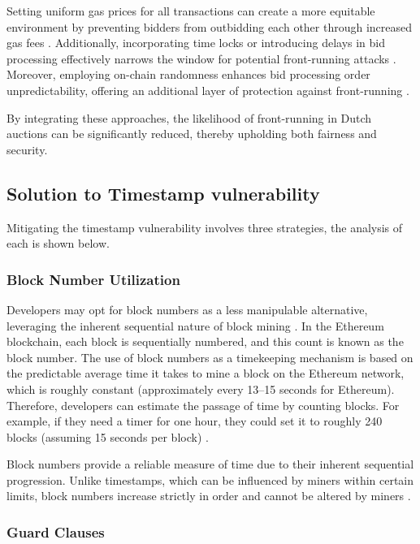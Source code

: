 \documentclass[conference]{IEEEtran}
\begin{document}
Setting uniform gas prices for all transactions can create a more equitable environment by preventing bidders from outbidding each other through increased gas fees \cite[Sec. 3.6, p. 50]{reference2023}. Additionally, incorporating time locks or introducing delays in bid processing effectively narrows the window for potential front-running attacks \cite[Sec. 3.3, p. 47]{reference2023}. Moreover, employing on-chain randomness enhances bid processing order unpredictability, offering an additional layer of protection against front-running \cite[Sec. 3.8, p. 52]{reference2023}. 


By integrating these approaches, the likelihood of front-running in Dutch auctions can be significantly reduced, thereby upholding both fairness and security.

\subsection{Solution to Timestamp vulnerability}
Mitigating the timestamp vulnerability involves three strategies, the analysis of each is shown below. 

\subsubsection{Block Number Utilization}

Developers may opt for block numbers as a less manipulable alternative, leveraging the inherent sequential nature of block mining \cite[Sec. 2.3, p. 15]{clark2012security}. 
In the Ethereum blockchain, each block is sequentially numbered, and this count is known as the block number. The use of block numbers as a timekeeping mechanism is based on the predictable average time it takes to mine a block on the Ethereum network, which is roughly constant (approximately every 13–15 seconds for Ethereum). Therefore, developers can estimate the passage of time by counting blocks. For example, if they need a timer for one hour, they could set it to roughly 240 blocks (assuming 15 seconds per block) \cite[Sec. 6.1, p. 22]{wood2014ethereum}.

Block numbers provide a reliable measure of time due to their inherent sequential progression. Unlike timestamps, which can be influenced by miners within certain limits, block numbers increase strictly in order and cannot be altered by miners \cite[Sec. 4.2, p. 11]{wood2014ethereum}.

\subsubsection{Guard Clauses}
\end{document}
